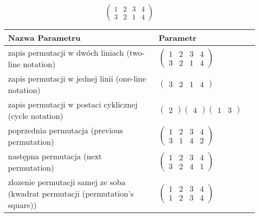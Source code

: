 \documentclass[12pt]{article}
\begin{document}
\subsection{}
\begin{center}
\[
\begin{pmatrix}
	1 & 2 & 3 & 4 \\ 
	3 & 2 & 1 & 4 
\end{pmatrix}
\]

\begin{tabular}{|m{0.6\linewidth}|m{0.4\linewidth}|}
	\hline
	Nazwa Parametru & Parametr \\
	\hline
	zapis permutacji w dwóch liniach (two-line notation) & $\begin{pmatrix} 1 & 2 & 3 & 4 \\ 
3 & 2 & 1 & 4 \end{pmatrix}$ \\ 
	\hline
	zapis permutacji w jednej linii (one-line notation) & $\begin{pmatrix} 3 & 2 & 1 & 4 \end{pmatrix}$ \\ 
	\hline
	zapis permutacji w postaci cyklicznej (cycle notation) & $\begin{pmatrix} 2 \end{pmatrix} \begin{pmatrix} 4 \end{pmatrix} \begin{pmatrix} 1 & 3 \end{pmatrix} $ \\ 
	\hline
	poprzednia permutacja (previous permutation) & $\begin{pmatrix} 1 & 2 & 3 & 4 \\ 
3 & 1 & 4 & 2 \end{pmatrix}$ \\ 
	\hline
	następna permutacja (next permutation) & $\begin{pmatrix} 1 & 2 & 3 & 4 \\ 
3 & 2 & 4 & 1 \end{pmatrix}$ \\ 
	\hline
	zlozenie permutacji samej ze soba (kwadrat permutacji (permutation's square)) & $\begin{pmatrix} 1 & 2 & 3 & 4 \\ 
1 & 2 & 3 & 4 \end{pmatrix}$ \\ 
	\hline
\end{tabular}
\end{center}
\end{document}
